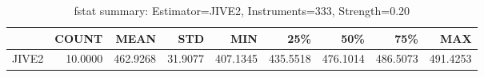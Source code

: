 \begin{table}[ht]
\centering
\caption{fstat summary: Estimator=JIVE2, Instruments=333, Strength=0.20}
\begin{tabular}{lrrrrrrrr}
\toprule
 & COUNT & MEAN & STD & MIN & 25\% & 50\% & 75\% & MAX \\
\midrule
JIVE2 & 10.0000 & 462.9268 & 31.9077 & 407.1345 & 435.5518 & 476.1014 & 486.5073 & 491.4253 \\
\bottomrule
\end{tabular}
\end{table}
